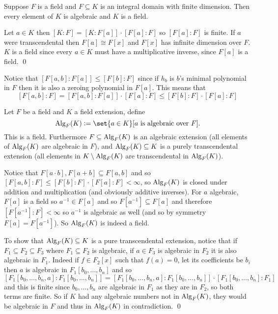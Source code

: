     Suppose $F$ is a field and $F\subseteq K$ is an integral domain with finite dimension.
    Then every element of $K$ is algebraic and $K$ is a field.

\ecoro

\Proof Let $a\in K$ then $[K:F]=[K:F[a]]\cdot[F[a]:F]$ so $[F[a]:F]$ is finite.
If $a$ were transcendental then $F[a]\cong F[x]$ and $F[x]$ has infinite dimension over $F$.
$K$ is a field since every $a\in K$ must have a multiplicative inverse, since $F[a]$ is a field.
\qed

Notice that $[F[a,b]:F[a]]\leq [F[b]:F]$ since if $h_b$ is $b$'s minimal polynomial in $F$ then it is also a zeroing polynomial in $F[a]$.
This means that
$$ [F[a,b]:F] = [F[a,b]:F[a]]\cdot[F[a]:F] \leq [F[b]:F]\cdot[F[a]:F] $$

\bcoro

    Let $F$ be a field and $K$ a field extension, define
    $$ {\rm Alg}_F(K) \coloneqq \set{a\in K}[\hbox{$a$ is algebraic over $F$}] . $$
    This is a field.
    Furthermore $F\subseteq{\rm Alg}_F(K)$ is an algebraic extension (all elements of ${\rm Alg}_F(K)$ are algebraic in $F$), and ${\rm Alg}_F(K)\subseteq K$ is a purely transcendental extension (all
    elements in $K\setminus{\rm Alg}_F(K)$ are transcendental in ${\rm Alg}_F(K)$).

\ecoro

\Proof Notice that $F[a\cdot b],F[a+b]\subseteq F[a,b]$ and so $[F[a,b]:F]\leq[F[b]:F]\cdot[F[a]:F]<\infty$, so ${\rm Alg}_F(K)$ is closed under addition and multiplication (and obviously additive inverses).
For $a$ algebraic, $F[a]$ is a field so $a^{-1}\in F[a]$ and so $F[a^{-1}]\subseteq F[a]$ and therefore $[F[a^{-1}]:F]<\infty$ so $a^{-1}$ is algebraic as well (and so by symmetry $F[a]=F[a^{-1}]$).
So ${\rm Alg}_F(K)$ is indeed a field.

To show that ${\rm Alg}_F(K)\subseteq K$ is a pure transcendental extension, notice that if $F_1\subseteq F_2\subseteq F_3$ where $F_1\subseteq F_2$ is algebraic, if $a\in F_3$ is algebraic in $F_2$
it is also algebraic in $F_1$.
Indeed if $f\in F_2[x]$ such that $f(a)=0$, let its coefficients be $b_i$ then $a$ is algebraic in $F_1[b_0,\dots,b_n]$ and so
$$ [F_1[b_0,\dots,b_n,a]:F_1[b_0,\dots,b_n]] = [F_1[b_0,\dots,b_n,a]:F_1[b_0,\dots,b_n]]\cdot[F_1[b_0,\dots,b_n]:F_1] $$
and this is finite since $b_0,\dots,b_n$ are algebraic in $F_1$ as they are in $F_2$, so both terms are finite.
So if $K$ had any algebraic numbers not in ${\rm Alg}_F(K)$, they would be algebraic in $F$ and thus in ${\rm Alg}_F(K)$ in contradiction.
\qed

